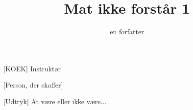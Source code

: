 \documentclass[a4paper,11pt]{article}
\title{Mat ikke forstår 1}
\author{en forfatter}
\begin{document}
\maketitle

\begin{roles}
[KOEK] Instruktør
\end{roles}

\begin{props}
[Person, der skaffer]
\end{props}


\begin{sketch}


[Udtryk] At være eller ikke være... 



\end{sketch}
\end{document}
